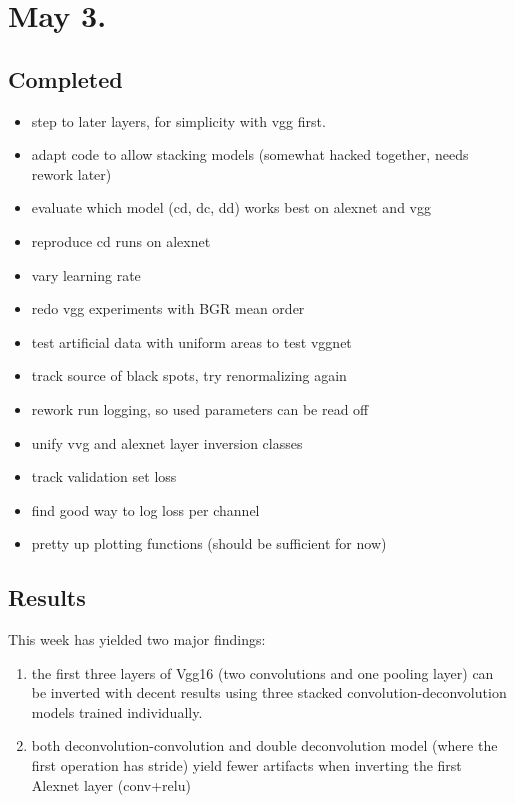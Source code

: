 \documentclass{article}
\begin{document}
\section*{May 3.}

\subsection*{Completed}
\begin{itemize}
    \item step to later layers, for simplicity with vgg first.
	\item  adapt code to allow stacking models (somewhat hacked together, needs rework later)
	\item evaluate which model (cd, dc, dd) works best on alexnet and vgg
	\item reproduce cd runs on alexnet 
	\item vary learning rate 
	\item redo vgg experiments with BGR mean order
	\item test artificial data with uniform areas to test vggnet
	\item track source of black spots, try renormalizing again
	\item rework run logging, so used parameters can be read off
	\item unify vvg and alexnet layer inversion classes
	\item track validation set loss
	\item find good way to log loss per channel
	\item pretty up plotting functions (should be sufficient for now)
\end{itemize}

\subsection*{Results}

This week has yielded two major findings:
\begin{enumerate}
    \item the first three layers of Vgg16 (two convolutions and one pooling layer) can be inverted with decent results using three stacked convolution-deconvolution models trained individually.
    \item both deconvolution-convolution and double deconvolution model (where the first operation has stride) yield fewer artifacts when inverting the first Alexnet layer (conv+relu)
\end{enumerate}
\end{document}
